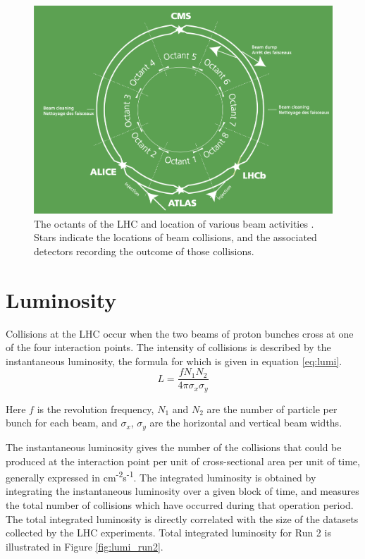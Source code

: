 \begin{figure}
        \centering
	\includegraphics[width=.7\textwidth]{figures/ch2/lhc_octants.png}
	\caption{The octants of the LHC and location of various beam activities \cite{lhc_faq}. Stars indicate the locations of beam collisions, and the associated detectors recording the outcome of those collisions.}
	\label{fig:lhc_octants}
\end{figure} 
 
 \section{Luminosity}
 
Collisions at the LHC occur when the two beams of proton bunches cross at one of the four interaction points. The intensity of collisions is described by the instantaneous luminosity, the formula for which is given in equation \ref{eq:lumi}.  
 \begin{equation}
	L = \frac{f N_1 N_2}{4 \pi \sigma_x \sigma_y}
	\label{eq:lumi}
\end{equation}

Here $f$ is the revolution frequency, $N_1$ and $N_2$ are the number of particle per bunch for each beam, and $\sigma_x$, $\sigma_y$ are the horizontal and vertical beam widths. \par

The instantaneous luminosity gives the number of the collisions that could be produced at the interaction point per unit of cross-sectional area per unit of time, generally expressed in cm\textsuperscript{-2}s\textsuperscript{-1}. The integrated luminosity is obtained by integrating the instantaneous luminosity over a given block of time, and measures the total number of collisions which have occurred during that operation period. The total integrated luminosity is directly correlated with the size of the datasets collected by the LHC experiments. Total integrated luminosity for Run 2 is illustrated in Figure \ref{fig:lumi_run2}. \par 

